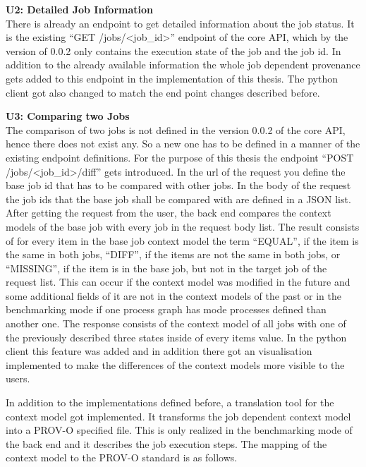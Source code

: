 \documentclass[draft,final]{vutinfth} %
\begin{document}
\textbf{U2: Detailed Job Information} \\
There is already an endpoint to get detailed information about the job status. It is the existing “GET /jobs/<job\_id>” endpoint of the core API, which by the version of 0.0.2 only contains the execution state of the job and the job id. In addition to the already available information the whole job dependent provenance gets added to this endpoint in the implementation of this thesis. The python client got also changed to match the end point changes described before.  

\textbf{U3: Comparing two Jobs} \\
The comparison of two jobs is not defined in the version 0.0.2 of the core API, hence there does not exist any. So a new one has to be defined in a manner of the existing endpoint definitions. For the purpose of this thesis the endpoint  “POST /jobs/<job\_id>/diff” gets introduced. In the url of the request you define the base job id that has to be compared with other jobs. In the body of the request the job ids that the base job shall be compared with are defined in a JSON list. After getting the request from the user, the back end compares the context models of the base job with every job in the request body list. The result consists of for every item in the base job context model the term “EQUAL”, if the item is the same in both jobs, “DIFF”, if the items are not the same in both jobs, or “MISSING”, if the item is in the base job, but not in the target job of the request list. This can occur if the context model was modified in the future and some additional fields of it are not in the context models of the past or in the benchmarking mode if one process graph has mode processes defined than another one. The response consists of the context model of all jobs with one of the previously described three states inside of every items value. In the python client this feature was added and in addition there got an visualisation implemented to make the differences of the context models more visible to the users.


In addition to the implementations defined before, a translation tool for the context model got implemented. It transforms the job dependent context model into a PROV-O specified file. This is only realized in the benchmarking mode of the back end and it describes the job execution steps. The mapping of the context model to the PROV-O standard is as follows.
\end{document}
